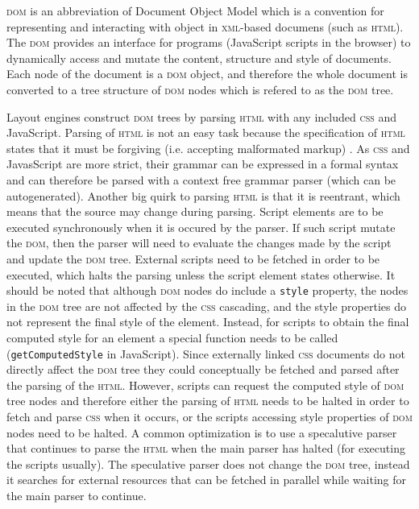 \documentclass[a4paper,11pt]{kth-mag}
\newcommand{\code}[1]{\texttt{#1}}
\begin{document}
        \textsc{dom} is an abbreviation of Document Object Model which is a convention for representing and interacting with object in \textsc{xml}-based documens (such as \textsc{html}).
        The \textsc{dom} provides an interface for programs (JavaScript scripts in the browser) to dynamically access and mutate the content, structure and style of documents.
        Each node of the document is a \textsc{dom} object, and therefore the whole document is converted to a tree structure of \textsc{dom} nodes which is refered to as the \textsc{dom} tree.

        Layout engines construct \textsc{dom} trees by parsing \textsc{html} with any included \textsc{css} and JavaScript.
        Parsing of \textsc{html} is not an easy task because the specification of \textsc{html} states that it must be forgiving (i.e. accepting malformated markup) .
        As \textsc{css} and JavasScript are more strict, their grammar can be expressed in a formal syntax and can therefore be parsed with a context free grammar parser (which can be autogenerated).
        Another big quirk to parsing \textsc{html} is that it is reentrant, which means that the source may change during parsing.
        Script elements are to be executed synchronously when it is occured by the parser.
        If such script mutate the \textsc{dom}, then the parser will need to evaluate the changes made by the script and update the \textsc{dom} tree.
        External scripts need to be fetched in order to be executed, which halts the parsing unless the script element states otherwise.
        It should be noted that although \textsc{dom} nodes do include a \code{style} property, the nodes in the \textsc{dom} tree are not affected by the \textsc{css} cascading, and the style properties do not represent the final style of the element.
        Instead, for scripts to obtain the final computed style for an element a special function needs to be called (\code{getComputedStyle} in JavaScript).
        Since externally linked \textsc{css} documents do not directly affect the \textsc{dom} tree they could conceptually be fetched and parsed after the parsing of the \textsc{html}.
        However, scripts can request the computed style of \textsc{dom} tree nodes and therefore either the parsing of \textsc{html} needs to be halted in order to fetch and parse \textsc{css} when it occurs, or the scripts accessing style properties of \textsc{dom} nodes need to be halted.
        A common optimization is to use a specalutive parser that continues to parse the \textsc{html} when the main parser has halted (for executing the scripts usually).
        The speculative parser does not change the \textsc{dom} tree, instead it searches for external resources that can be fetched in parallel while waiting for the main parser to continue.
\end{document}
